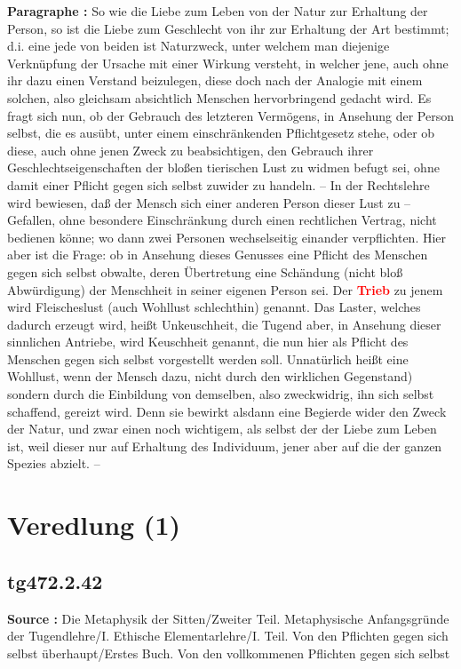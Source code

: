 \documentclass[a4paper,12pt,twoside]{book}
\newcommand{\match}[1]{\textcolor{red}{\textbf{#1}}}
\newcommand{\unnumberedsection}[1]{
	\section*{#1}
	\addcontentsline{toc}{section}{#1}
	\markright{#1}
}
\begin{document}
	\textbf{Paragraphe : }So wie die Liebe zum Leben von der Natur zur Erhaltung der Person, so ist die Liebe zum Geschlecht von ihr zur Erhaltung der Art bestimmt; d.i. eine jede von beiden ist 
	Naturzweck, unter welchem man diejenige Verknüpfung der Ursache mit einer Wirkung versteht, in welcher jene, auch ohne ihr dazu einen Verstand beizulegen, diese doch nach der Analogie mit einem solchen, also gleichsam absichtlich Menschen hervorbringend gedacht wird. Es fragt sich nun, ob der Gebrauch des letzteren Vermögens, in Ansehung der Person selbst, die es ausübt, unter einem einschränkenden Pflichtgesetz stehe, oder ob diese, auch ohne jenen Zweck zu beabsichtigen, den Gebrauch ihrer Geschlechtseigenschaften der bloßen tierischen Lust zu widmen befugt sei, ohne damit einer Pflicht gegen sich selbst zuwider zu handeln. – In der Rechtslehre wird bewiesen, daß der Mensch sich einer anderen Person dieser Lust zu – Gefallen, ohne besondere Einschränkung durch einen rechtlichen Vertrag, nicht bedienen könne; wo dann zwei Personen wechselseitig einander verpflichten. Hier aber ist die Frage: ob in Ansehung dieses Genusses eine Pflicht des Menschen gegen sich selbst obwalte, deren Übertretung eine Schändung (nicht bloß Abwürdigung) der Menschheit in seiner eigenen Person sei. Der \match{Trieb} zu jenem wird Fleischeslust (auch Wohllust schlechthin) genannt. Das Laster, welches dadurch erzeugt wird, heißt Unkeuschheit, die Tugend aber, in Ansehung dieser sinnlichen Antriebe, wird Keuschheit genannt, die nun hier als Pflicht des Menschen gegen sich selbst vorgestellt werden soll. Unnatürlich heißt eine Wohllust, wenn der Mensch dazu, nicht durch den wirklichen Gegenstand) sondern durch die Einbildung von demselben, also zweckwidrig, ihn sich selbst schaffend, gereizt wird. Denn sie bewirkt alsdann eine Begierde wider den Zweck der Natur, und zwar einen noch wichtigem, als selbst der der Liebe zum Leben ist, weil dieser nur auf Erhaltung des Individuum, jener aber auf die der ganzen Spezies abzielt. – 
	
	\unnumberedsection{Veredlung (1)} 
	\subsection*{tg472.2.42} 
	\textbf{Source : }Die Metaphysik der Sitten/Zweiter Teil. Metaphysische Anfangsgründe der Tugendlehre/I. Ethische Elementarlehre/I. Teil. Von den Pflichten gegen sich selbst überhaupt/Erstes Buch. Von den vollkommenen Pflichten gegen sich selbst\\  
	
\end{document}
